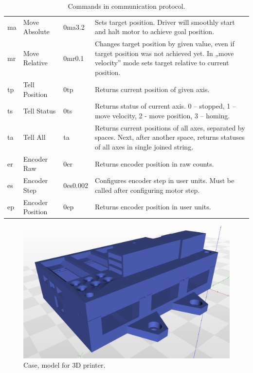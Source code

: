 \documentclass[10pt,article]{article}
\begin{document}
\begin{table}[ht]
\begin{tabularx}{\textwidth}{lllX}
\rowcolor[gray]{0.90} ma & Move Absolute & 0ma3.2 & Sets target position. Driver will smoothly start and halt motor to achieve goal position. \\
\rowcolor[gray]{0.95} mr & Move Relative & 0mr0.1 & Changes target position by given value, even if target position was not achieved yet. In „move velocity” mode sets target relative to current position. \\
\rowcolor[gray]{0.90} tp & Tell Position & 0tp & Returns current position of given axis. \\
\rowcolor[gray]{0.95} ts & Tell Status & 0ts & Returns status of current axis. 0 – stopped, 1 – move velocity, 2 - move position, 3 – homing. \\
\rowcolor[gray]{0.90} ta & Tell All & ta & Returns current positions of all axes, separated by spaces. Next, after another space, returns statuses of all axes in single joined string.\\
\rowcolor[gray]{0.95} er & Encoder Raw & 0er & Returns encoder position in raw counts.\\
\rowcolor[gray]{0.90} es & Encoder Step & 0es0.002 & Configures encoder step in user units. Must be called after configuring motor step.\\
\rowcolor[gray]{0.95} ep & Encoder Position & 0ep & Returns encoder position in user units. \\
\end{tabularx}
\caption{Commands in communication protocol.}\label{commands}
\end{table}

\begin{figure}[H]
 \centering
 \includegraphics[width = 15cm]{case.png}
\caption {Case, model for 3D printer.} \label{case}
\end{figure}
\end{document}
